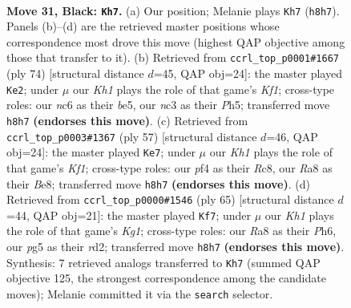 \documentclass[11pt]{article}
\begin{document}
\clearpage

\begin{figure}[p]\centering
\begin{subfigure}{0.46\textwidth}\centering
\resizebox{\linewidth}{!}{%
\newchessgame
\chessboard[
  setfen={r4b1k/p7/2N3p1/1P4P1/P4P2/2N5/8/R1B1K3 b Q - 0 31},
  showmover=false,
  pgfstyle=straightmove, color=movearrow, markmove={h8-h7}
]}
\caption{}
\end{subfigure}\hfill
\begin{subfigure}{0.46\textwidth}\centering
\resizebox{\linewidth}{!}{%
\newchessgame
\chessboard[
  setfen={6k1/6p1/p1r2p2/4b2P/8/1P1R2P1/8/4BK2 w - - 0 38},
  showmover=false,
  pgfstyle=straightmove, color=movearrow, markmove={f1-e2}
]}
\caption{}
\end{subfigure}
\\[4pt]
\begin{subfigure}{0.46\textwidth}\centering
\resizebox{\linewidth}{!}{%
\newchessgame
\chessboard[
  setfen={2r1bk2/8/4p1pp/2p1N3/5P2/R6P/5PP1/6K1 b - - 4 29},
  showmover=false,
  pgfstyle=straightmove, color=movearrow, markmove={f8-e7}
]}
\caption{}
\end{subfigure}\hfill
\begin{subfigure}{0.46\textwidth}\centering
\resizebox{\linewidth}{!}{%
\newchessgame
\chessboard[
  setfen={6k1/6b1/7p/5pp1/8/3P1N1P/3R1PPK/1r6 b - - 5 33},
  showmover=false,
  pgfstyle=straightmove, color=movearrow, markmove={g8-f7}
]}
\caption{}
\end{subfigure}
\caption{\textbf{Move 31, Black: \texttt{Kh7}.} (a) Our position; Melanie plays \texttt{Kh7} (\texttt{h8h7}). Panels (b)--(d) are the retrieved master positions whose correspondence most drove this move (highest QAP objective among those that transfer to it). (b) Retrieved from \texttt{ccrl\_top\_p0001\#1667} (ply 74) [structural distance $d$=45, QAP obj=24]: the master played \texttt{Ke2}; under $\mu$ our \emph{Kh1} plays the role of that game's \emph{Kf1}; cross-type roles: our \emph{n}c6 as their \emph{b}e5, our \emph{n}c3 as their \emph{P}h5; transferred move \texttt{h8h7} \textbf{(endorses this move)}. (c) Retrieved from \texttt{ccrl\_top\_p0003\#1367} (ply 57) [structural distance $d$=46, QAP obj=24]: the master played \texttt{Ke7}; under $\mu$ our \emph{Kh1} plays the role of that game's \emph{Kf1}; cross-type roles: our \emph{p}f4 as their \emph{R}c8, our \emph{R}a8 as their \emph{B}e8; transferred move \texttt{h8h7} \textbf{(endorses this move)}. (d) Retrieved from \texttt{ccrl\_top\_p0000\#1546} (ply 65) [structural distance $d$=44, QAP obj=21]: the master played \texttt{Kf7}; under $\mu$ our \emph{Kh1} plays the role of that game's \emph{Kg1}; cross-type roles: our \emph{R}a8 as their \emph{P}h6, our \emph{p}g5 as their \emph{r}d2; transferred move \texttt{h8h7} \textbf{(endorses this move)}. Synthesis: 7 retrieved analogs transferred to \texttt{Kh7} (summed QAP objective 125, the strongest correspondence among the candidate moves); Melanie committed it via the \texttt{search} selector.}
\label{fig:thought-m61}
\end{figure}
\end{document}
